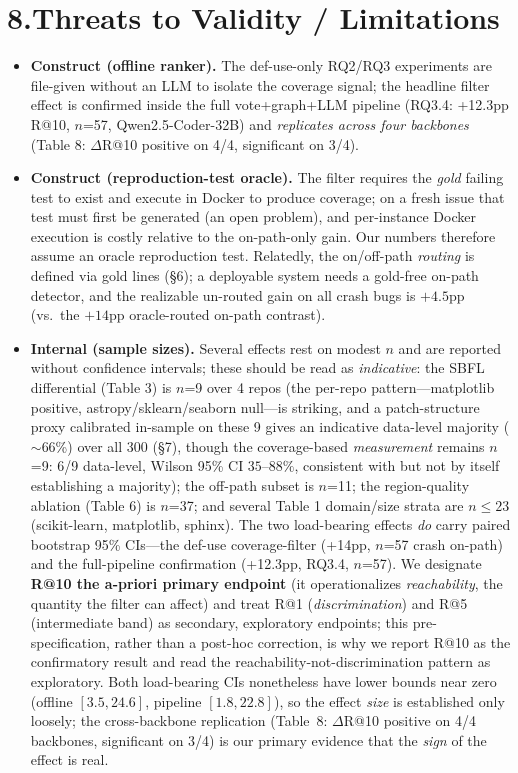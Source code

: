 \documentclass[11pt]{article}
\begin{document}
\section*{8.\quad Threats to Validity / Limitations}
\begin{itemize}
  \item \textbf{Construct (offline ranker).} The def-use-only RQ2/RQ3 experiments are file-given without an LLM to isolate the coverage signal; the headline filter effect is confirmed inside the full vote+graph+LLM pipeline (RQ3.4: +12.3pp R@10, $n$=57, Qwen2.5-Coder-32B) and \emph{replicates across four backbones} (Table 8: $\Delta$R@10 positive on 4/4, significant on 3/4).
  \item \textbf{Construct (reproduction-test oracle).} The filter requires the \emph{gold} failing test to exist and execute in Docker to produce coverage; on a fresh issue that test must first be generated (an open problem), and per-instance Docker execution is costly relative to the on-path-only gain. Our numbers therefore assume an oracle reproduction test. Relatedly, the on/off-path \emph{routing} is defined via gold lines (\S6); a deployable system needs a gold-free on-path detector, and the realizable un-routed gain on all crash bugs is $+4.5$pp (vs.\ the $+14$pp oracle-routed on-path contrast).
  \item \textbf{Internal (sample sizes).} Several effects rest on modest $n$ and are reported without confidence intervals; these should be read as \emph{indicative}: the SBFL differential (Table 3) is $n$=9 over 4 repos (the per-repo pattern---matplotlib positive, astropy/sklearn/seaborn null---is striking, and a patch-structure proxy calibrated in-sample on these 9 gives an indicative data-level majority ($\sim$66\%) over all 300 (\S7), though the coverage-based \emph{measurement} remains $n$=9: 6/9 data-level, Wilson 95\% CI $35$--$88\%$, consistent with but not by itself establishing a majority); the off-path subset is $n$=11; the region-quality ablation (Table 6) is $n$=37; and several Table 1 domain/size strata are $n\le23$ (scikit-learn, matplotlib, sphinx). The two load-bearing effects \emph{do} carry paired bootstrap 95\% CIs---the def-use coverage-filter (+14pp, $n$=57 crash on-path) and the full-pipeline confirmation (+12.3pp, RQ3.4, $n$=57). We designate \textbf{R@10 the a-priori primary endpoint} (it operationalizes \emph{reachability}, the quantity the filter can affect) and treat R@1 (\emph{discrimination}) and R@5 (intermediate band) as secondary, exploratory endpoints; this pre-specification, rather than a post-hoc correction, is why we report R@10 as the confirmatory result and read the reachability-not-discrimination pattern as exploratory. Both load-bearing CIs nonetheless have lower bounds near zero (offline $[3.5,24.6]$, pipeline $[1.8,22.8]$), so the effect \emph{size} is established only loosely; the cross-backbone replication (Table~8: $\Delta$R@10 positive on 4/4 backbones, significant on 3/4) is our primary evidence that the \emph{sign} of the effect is real.

\end{itemize}
\end{document}

